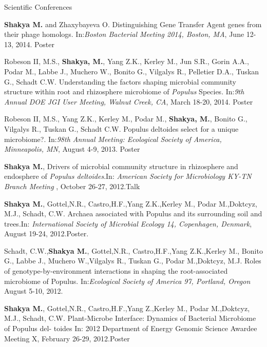 \documentclass{resume} %
\begin{document}
\begin{rSection}{Scientific Conferences}
\item \textbf{Shakya M.} and Zhaxybayeva O. Distinguishing Gene Transfer Agent genes from their phage homologs. In:\emph{Boston Bacterial Meeting 2014, Boston, MA}, June 12-13, 2014. Poster

\item Robeson II, M.S., \textbf{Shakya, M.}, Yang Z.K., Kerley M., Jun S.R., Gorin A.A., Podar M., Labbe J., Muchero W., Bonito G., Vilgalys R., Pelletier D.A., Tuskan G., Schadt C.W. Understanding the factors shaping microbial community structure within root and rhizosphere microbiome of \textit{Populus} Species. In:\emph{9th Annual DOE JGI User Meeting, Walnut Creek, CA}, March 18-20, 2014. Poster

\item  Robeson II, M.S., Yang Z.K., Kerley M., Podar M., \textbf{Shakya, M.}, Bonito G., Vilgalys R., Tuskan G., Schadt C.W. Populus deltoides select for a unique microbiome?. In:\emph{98th Annual Meeting: Ecological Society of America, Minneapolis, MN}, August 4-9, 2013. Poster


\item \textbf{Shakya M.}, Drivers of microbial community structure in rhizosphere and endosphere of \textit{Populus deltoides}.In: \emph{American Society for Microbiology KY-TN Branch Meeting }, October 26-27, 2012.Talk

\item  \textbf{Shakya M.}, Gottel,N.R., Castro,H.F.,Yang Z.K.,Kerley M., Podar M.,Doktcyz, M.J., Schadt, C.W. Archaea associated with Populus and its surrounding soil and trees.In: \emph{International Society of Microbial Ecology 14, Copenhagen, Denmark}, August 19-24, 2012.Poster.


\item Schadt, C.W.,\textbf{Shakya M.}, Gottel,N.R., Castro,H.F.,Yang Z.K.,Kerley M., Bonito G., Labbe J., Muchero W.,Vilgalys R., Tuskan G., Podar M.,Doktcyz, M.J. Roles of genotype-by-environment interactions in shaping the root-associated microbiome of Populus. In:\emph{Ecological Society of America 97, Portland, Oregon} August 5-10, 2012.

\item \textbf{Shakya M.}, Gottel,N.R., Castro,H.F.,Yang Z.,Kerley M., Podar M.,Doktcyz, M.J., Schadt, C.W. Plant-Microbe Interface: Dynamics of Bacterial Microbiome of Populus del- toides In: 2012 Department of Energy Genomic Science Awardee Meeting X, February 26-29, 2012.Poster


\end{rSection}
\end{document}
